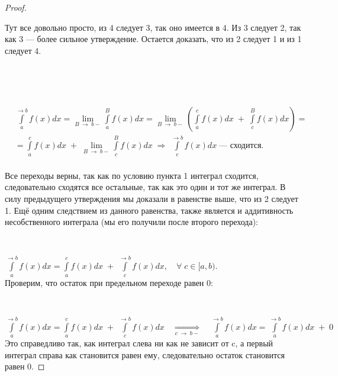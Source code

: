 \documentclass[../main.tex]{subfiles}
\begin{document}
\begin{proof}
    
    ~

    Тут все довольно просто, из 4 следует 3, так оно имеется в 4. Из 3 следует 2, так как 3 --- более сильное утверждение. Остается доказать, что из 2 следует 1 и из 1 следует 4.
    
    ~


    ~

    \(
    \begin{aligned}
        &\displaystyle\int\limits_{ a}^{ \rightarrow b} f(x)dx = \lim\limits_{ B \; \rightarrow \; b-} \displaystyle\int\limits_{ a}^{ B} f(x)dx = \lim\limits_{ B \; \rightarrow \; b-} ( \displaystyle\int\limits_{ a}^{ c} f(x)dx \; + \; \displaystyle\int\limits_{ c}^{ B} f(x)dx ) = \\[5pt] 
        & = \displaystyle\int\limits_{ a}^{ c} f(x)dx \; + \; \lim\limits_{ B \; \rightarrow \; b-} \displaystyle\int\limits_{ c}^{ B} f(x)dx \; \Rightarrow \; \displaystyle\int\limits_{ c}^{ \rightarrow b} f(x)dx \; \text{--- сходится.}  \\
    \end{aligned}
    \)
    
    Все переходы верны, так как по условию пункта 1 интеграл сходится, следовательно сходятся все остальные, так как это один и тот же интеграл. В силу предыдущего утверждения мы доказали в равенстве выше, что из 2 следует 1. Ещё одним следствием из данного равенства, также является и аддитивность несобственного интеграла (мы его получили после второго перехода):

    ~

    \( \displaystyle\int\limits_{a}^{ \rightarrow b} f(x)dx = \displaystyle\int\limits_{ a}^{ c} f(x)dx \; + \; \displaystyle\int\limits_{c}^{ \rightarrow b} f(x)dx,\quad \forall \; c \in [a, b).\) \\

    Проверим, что остаток при предельном переходе равен 0:

    ~

    \( \displaystyle\int\limits_{a}^{ \rightarrow b} f(x)dx = \displaystyle\int\limits_{ a}^{ c} f(x)dx \; + \; \displaystyle\int\limits_{ c}^{ \rightarrow b} f(x)dx\quad \underset{c \; \rightarrow \; b-}{\Longrightarrow} \quad \displaystyle\int\limits_{a}^{ \rightarrow b} f(x)dx = \displaystyle\int\limits_{ a}^{ \rightarrow b} f(x)dx \; + \; 0\)\\
    Это справедливо так, как интеграл слева ни как не зависит от c, а первый интеграл справа как становится равен ему, следовательно остаток становится равен 0.
    
\end{proof}
\end{document}
